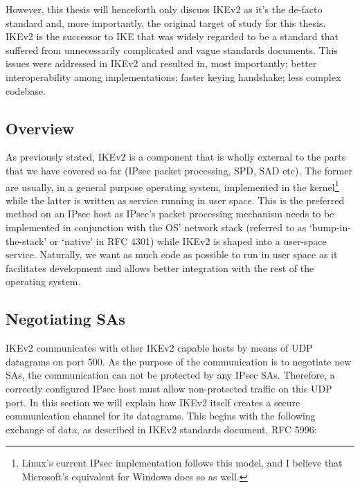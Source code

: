 \documentclass[final,a4paper,twoside,11pt,onecolumn]{report}
\begin{document}
However, this thesis will henceforth only discuss IKEv2 as it's the de-facto standard and, more importantly, the original target of study for this thesis. IKEv2 is the successor to IKE that was widely regarded to be a standard that suffered from unnecessarily complicated and vague standards documents. This issues were addressed in IKEv2 and resulted in, most importantly: better interoperability among implementations; faster keying handshake; less complex codebase.

\subsection{Overview}
As previously stated, IKEv2 is a component that is wholly external to the parts that we have covered so far (IPsec packet processing, SPD, SAD etc). The former are usually, in a general purpose operating system, implemented in the kernel\footnote{Linux's current IPsec implementation follows this model, and I believe that Microsoft's equivalent for Windows does so as well.} while the latter is written as service running in user space. This is the preferred method on an IPsec host as IPsec's packet processing mechanism needs to be implemented in conjunction with the OS' network stack (referred to as `bump-in-the-stack' or `native' in RFC 4301\citep[p.10-11]{rfc4301}) while IKEv2 is shaped into a user-space service. Naturally, we want as much code as possible to run in user space as it facilitates development and allows better integration with the rest of the operating system.

\subsection{Negotiating SAs}
IKEv2 communicates with other IKEv2 capable hosts by means of UDP datagrams on port 500. As the purpose of the communication is to negotiate new SAs, the communication can not be protected by any IPsec SAs. Therefore, a correctly configured IPsec host must allow non-protected traffic on this UDP port. In this section we will explain how IKEv2 itself creates a secure communication channel for its datagrams. This begins with the following exchange of data, as described in IKEv2 standards document, RFC 5996\citep[p.5]{rfc5996}:  
\end{document}
